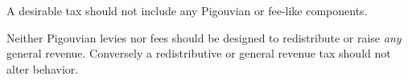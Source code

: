 




\begin{desideratum}
	A desirable tax should not include any Pigouvian or fee-like components.
	\label{des:ordoliberal-hygiene}
\end{desideratum}


Neither Pigouvian levies nor fees should be designed to redistribute or raise \emph{any} general revenue. Conversely a redistributive or general revenue tax should not alter behavior. 


